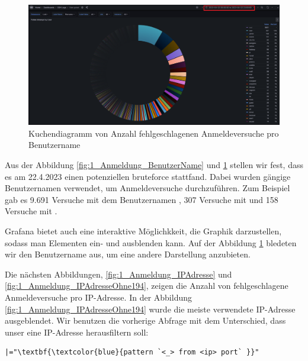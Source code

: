 \newpage
{}
\thispagestyle{lscape}
\begin{landscape}
    \begin{figure}[H]
        \centerline{\includegraphics[width=1.7\textwidth]{assets/Failed_pro_user2.png}}
        \caption[Kuchendiagramm von Anzahl fehlgeschlagenen Anmeldeversuche pro Benutzername]
        {Kuchendiagramm von Anzahl fehlgeschlagenen Anmeldeversuche pro Benutzername}
        \label{fig:1_Anmeldung_BenutzerNameOhneRoot}
        \centering
    \end{figure}
\end{landscape}
\restoregeometry

Aus der Abbildung \ref{fig:1_Anmeldung_BenutzerName} und \ref{fig:1_Anmeldung_BenutzerNameOhneRoot} stellen wir fest, dass es am 22.4.2023 einen potenziellen \gls{bruteforce} stattfand. Dabei wurden gängige Benutzernamen verwendet, um Anmeldeversuche durchzuführen. Zum Beispiel gab es 9.691 Versuche mit dem Benutzernamen , 307 Versuche mit  und 158 Versuche mit . 

Grafana bietet auch eine interaktive Möglichkkeit, die Graphik darzustellen, sodass man Elementen ein- und ausblenden kann. Auf der Abbildung \ref{fig:1_Anmeldung_BenutzerNameOhneRoot} bledeten wir den Benutzername  aus, um eine andere Darstellung anzubieten.

Die nächsten Abbildungen, \ref{fig:1_Anmeldung_IPAdresse} und \ref{fig:1_Anmeldung_IPAdresseOhne194}, zeigen die Anzahl von fehlgeschlagene Anmeldeversuche pro IP-Adresse. In der Abbildung \ref{fig:1_Anmeldung_IPAdresseOhne194} wurde die meiste verwendete IP-Adresse ausgeblendet. Wir benutzen die vorherige Abfrage mit dem Unterschied, dass unser \textcolor{blue}{} eine IP-Adresse herausfiltern soll:

{
\begin{Verbatim}[fontsize=\small,commandchars=\\\{\},frame=single]
|="\textbf{\textcolor{blue}{pattern `<_> from <ip> port` }}"
\end{Verbatim}
}

